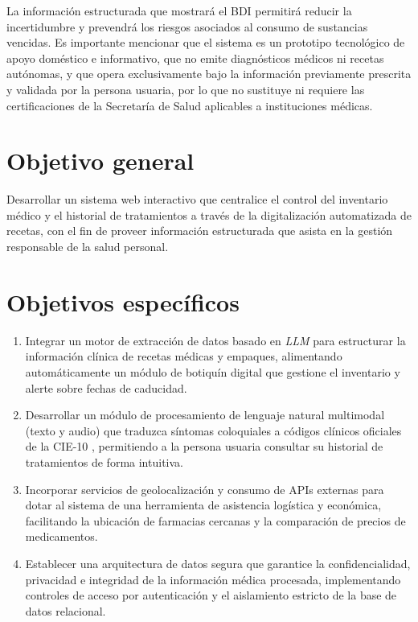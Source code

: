 La información estructurada que mostrará el BDI permitirá reducir la incertidumbre y prevendrá los riesgos asociados al consumo de sustancias vencidas. Es importante mencionar que el sistema es un prototipo tecnológico de apoyo doméstico e informativo, que no emite diagnósticos médicos ni recetas autónomas, y que opera exclusivamente bajo la información previamente prescrita y validada por la persona usuaria, por lo que no sustituye ni requiere las certificaciones de la Secretaría de Salud aplicables a instituciones médicas.


\section{Objetivo general}

Desarrollar un sistema web interactivo que centralice el control del inventario médico y el historial de tratamientos a través de la digitalización automatizada de recetas, con el fin de proveer información estructurada que asista en la gestión responsable de la salud personal.

\section{Objetivos específicos}

\begin{enumerate}
    \item Integrar un motor de extracción de datos basado en \emph{LLM} para estructurar la información clínica de recetas médicas y empaques, alimentando automáticamente un módulo de botiquín digital que gestione el inventario y alerte sobre fechas de caducidad.
    \item Desarrollar un módulo de procesamiento de lenguaje natural multimodal (texto y audio) que traduzca síntomas coloquiales a códigos clínicos oficiales de la CIE-10 \cite{CIE10}, permitiendo a la persona usuaria consultar su historial de tratamientos de forma intuitiva.
    \item Incorporar servicios de geolocalización y consumo de APIs externas para dotar al sistema de una herramienta de asistencia logística y económica, facilitando la ubicación de farmacias cercanas y la comparación de precios de medicamentos.
    \item Establecer una arquitectura de datos segura que garantice la confidencialidad, privacidad e integridad de la información médica procesada, implementando controles de acceso por autenticación y el aislamiento estricto de la base de datos relacional.
\end{enumerate}

